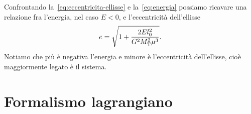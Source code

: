 Confrontando la~\eqref{eq:eccentricita-ellisse} e la~\eqref{eq:energia} possiamo
ricavare una relazione fra l'energia, nel caso $E<0$, e l'eccentricità
dell'ellisse
\begin{equation}
  e = \sqrt{1+\frac{2El_0^2}{G^2M_\textup{T}^2\mu^3}}.
\end{equation}
Notiamo che più è negativa l'energia e minore è l'eccentricità dell'ellisse,
cioè maggiormente legato è il sistema. %

\section{Formalismo lagrangiano}
\label{sec:formalismo-lagrange}



